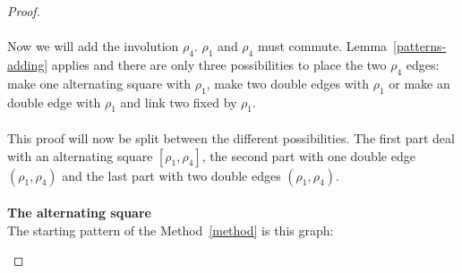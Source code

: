 \begin{proof}
\paragraph{}
Now we will add the involution $\rho_4$. $\rho_1$ and $\rho_4$ must commute. Lemma~\ref{patterns-adding} applies and there are only three possibilities to place the two $\rho_4$ edges: make one alternating square with $\rho_1$, make two double edges with $\rho_1$ or make an double edge with $\rho_1$ and link two fixed by $\rho_1$.

\paragraph{}
This proof will now be split between the different possibilities. The first part deal with an alternating square $[\rho_1, \rho_4]$, the second part with one double edge $(\rho_1, \rho_4)$ and the last part with two double edges $(\rho_1, \rho_4)$.

\paragraph{}
\textbf{The alternating square}\\
The starting pattern of the Method~\ref{method} is this graph:

\begin{figure}[H]
  \begin{center}
\end{center}
\end{figure}
\end{proof}
